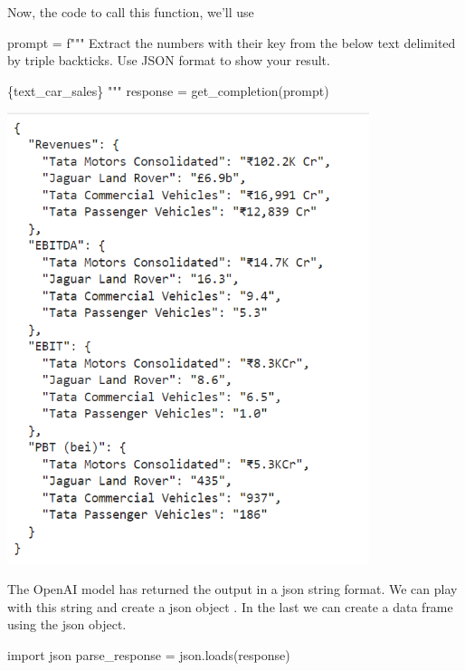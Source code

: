 \documentclass[
  letterpaper,
  DIV=11,
  numbers=noendperiod]{scrreprt}
\newenvironment{Shaded}{\begin{snugshade}}{\end{snugshade}}
\newcommand{\ImportTok}[1]{\textcolor[rgb]{0.00,0.46,0.62}{#1}}
\newcommand{\NormalTok}[1]{\textcolor[rgb]{0.00,0.23,0.31}{#1}}
\newcommand{\OperatorTok}[1]{\textcolor[rgb]{0.37,0.37,0.37}{#1}}
\newcommand{\SpecialCharTok}[1]{\textcolor[rgb]{0.37,0.37,0.37}{#1}}
\newcommand{\SpecialStringTok}[1]{\textcolor[rgb]{0.13,0.47,0.30}{#1}}
\begin{document}
Now, the code to call this function, we'll use

\begin{Shaded}
\begin{Highlighting}[]
\NormalTok{prompt }\OperatorTok{=} \SpecialStringTok{f"""}
\SpecialStringTok{Extract the numbers with their key from the below text delimited by triple backticks.}
\SpecialStringTok{Use JSON format to show your result.}

\SpecialStringTok{\textasciigrave{}\textasciigrave{}\textasciigrave{}}\SpecialCharTok{\{}\NormalTok{text\_car\_sales}\SpecialCharTok{\}}\SpecialStringTok{\textasciigrave{}\textasciigrave{}\textasciigrave{}}
\SpecialStringTok{"""}
\NormalTok{response }\OperatorTok{=}\NormalTok{ get\_completion(prompt)}
\end{Highlighting}
\end{Shaded}

\includegraphics[width=4.16667in,height=\textheight]{CH1_JSON_String_1.png}

The OpenAI model has returned the output in a json string format. We can
play with this string and create a json object . In the last we can
create a data frame using the json object.

\begin{Shaded}
\begin{Highlighting}[]
\ImportTok{import}\NormalTok{ json}
\NormalTok{parse\_response }\OperatorTok{=}\NormalTok{ json.loads(response)}
\end{Highlighting}
\end{Shaded}
\end{document}
